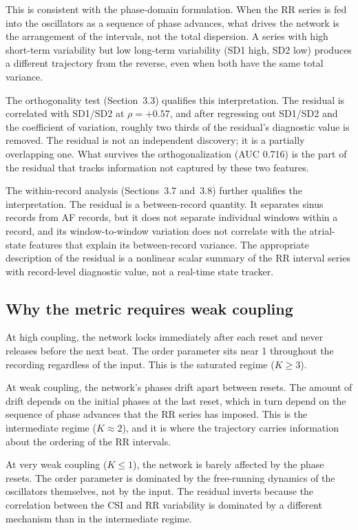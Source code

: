\documentclass[11pt]{article}
\begin{document}
This is consistent with the phase-domain formulation. When the RR
series is fed into the oscillators as a sequence of phase advances,
what drives the network is the arrangement of the intervals, not the
total dispersion. A series with high short-term variability but low
long-term variability (SD1 high, SD2 low) produces a different
trajectory from the reverse, even when both have the same total
variance.

The orthogonality test (Section~3.3) qualifies this interpretation. The
residual is correlated with SD1/SD2 at $\rho = +0.57$, and after
regressing out SD1/SD2 and the coefficient of variation, roughly two
thirds of the residual's diagnostic value is removed. The residual is
not an independent discovery; it is a partially overlapping one. What
survives the orthogonalization (AUC 0.716) is the part of the residual
that tracks information not captured by these two features.

The within-record analysis (Sections~3.7 and~3.8) further qualifies the
interpretation. The residual is a between-record quantity. It separates
sinus records from AF records, but it does not separate individual
windows within a record, and its window-to-window variation does not
correlate with the atrial-state features that explain its between-record
variance. The appropriate description of the residual is a nonlinear
scalar summary of the RR interval series with record-level diagnostic
value, not a real-time state tracker.

\subsection{Why the metric requires weak coupling}

At high coupling, the network locks immediately after each reset and
never releases before the next beat. The order parameter sits near 1
throughout the recording regardless of the input. This is the saturated
regime ($K \geq 3$).

At weak coupling, the network's phases drift apart between resets. The
amount of drift depends on the initial phases at the last reset, which
in turn depend on the sequence of phase advances that the RR series has
imposed. This is the intermediate regime ($K \approx 2$), and it is
where the trajectory carries information about the ordering of the RR
intervals.

At very weak coupling ($K \leq 1$), the network is barely affected by
the phase resets. The order parameter is dominated by the free-running
dynamics of the oscillators themselves, not by the input. The residual
inverts because the correlation between the CSI and RR variability is
dominated by a different mechanism than in the intermediate regime.
\end{document}
